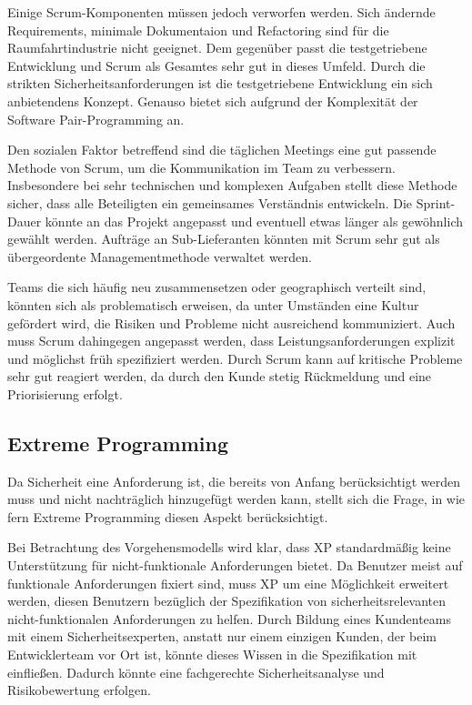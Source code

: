 Einige Scrum-Komponenten müssen jedoch verworfen werden.
Sich ändernde Requirements, minimale Dokumentaion und Refactoring sind für die Raumfahrtindustrie nicht geeignet.
Dem gegenüber passt die testgetriebene Entwicklung und Scrum als Gesamtes sehr gut in dieses Umfeld.
Durch die strikten Sicherheitsanforderungen ist die testgetriebene Entwicklung ein sich anbietendens Konzept.
Genauso bietet sich aufgrund der Komplexität der Software Pair-Programming an.
\parencite[Vgl.][S. 43 f.]{Carpenter:2014aa}

Den sozialen Faktor betreffend sind die täglichen Meetings eine gut passende Methode von Scrum, um die Kommunikation im Team zu verbessern.
Insbesondere bei sehr technischen und komplexen Aufgaben stellt diese Methode sicher, dass alle Beteiligten ein gemeinsames Verständnis entwickeln.
Die Sprint-Dauer könnte an das Projekt angepasst und eventuell etwas länger als gewöhnlich gewählt werden.
Aufträge an Sub-Lieferanten könnten mit Scrum sehr gut als übergeordente Managementmethode verwaltet werden.
\parencite[Vgl.][S. 43 f.]{Carpenter:2014aa}

Teams die sich häufig neu zusammensetzen oder geographisch verteilt sind, könnten sich als problematisch erweisen, da unter Umständen eine Kultur gefördert wird, die Risiken und Probleme nicht ausreichend kommuniziert.
Auch muss Scrum dahingegen angepasst werden, dass Leistungsanforderungen explizit und möglichst früh spezifiziert werden.
Durch Scrum kann auf kritische Probleme sehr gut reagiert werden, da durch den Kunde stetig Rückmeldung und eine Priorisierung erfolgt.
\parencite[Vgl.][S. 44]{Carpenter:2014aa}

\subsection{Extreme Programming}

Da Sicherheit eine Anforderung ist, die bereits von Anfang berücksichtigt werden muss und nicht nachträglich hinzugefügt werden kann, stellt sich die Frage, in wie fern Extreme Programming diesen Aspekt berücksichtigt.

Bei Betrachtung des Vorgehensmodells wird klar, dass XP standardmäßig keine Unterstützung für nicht-funktionale Anforderungen bietet.
Da Benutzer meist auf funktionale Anforderungen fixiert sind, muss XP um eine Möglichkeit erweitert werden, diesen Benutzern bezüglich der Spezifikation von sicherheitsrelevanten nicht-funktionalen Anforderungen zu helfen.
Durch Bildung eines Kundenteams mit einem Sicherheitsexperten, anstatt nur einem einzigen Kunden, der beim Entwicklerteam vor Ort ist, könnte dieses Wissen in die Spezifikation mit einfließen.
Dadurch könnte eine fachgerechte Sicherheitsanalyse und Risikobewertung erfolgen.
\parencite[Vgl.][S. 8 - 11]{Wayrynen:2004aa}

